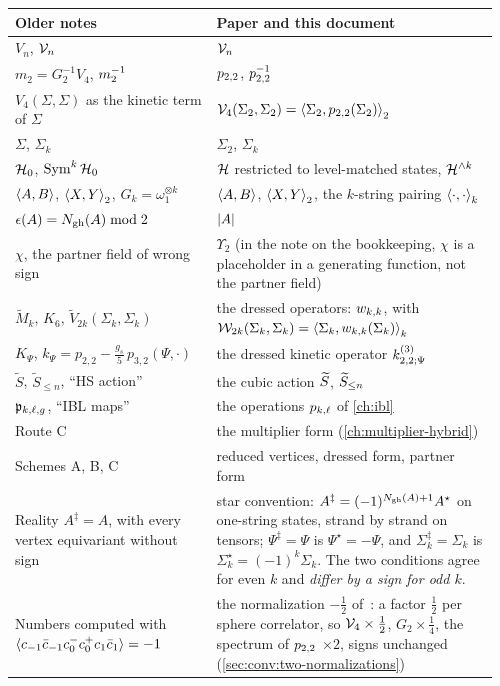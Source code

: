 \begin{center}
  \footnotesize
  \begin{tabular}{@{}>{\raggedright\arraybackslash}p{0.4\linewidth}>{\raggedright\arraybackslash}p{0.56\linewidth}@{}}
    \toprule
    Older notes & Paper and this document \\
    \midrule
    $V_n$, $\mc V_n$ & $\vertex{n}$ \\
    $m_2 = G_2^{-1} V_4$, $\mtwo^{-1}$ & $\sprod{2}{2}$, $\sprod{2}{2}^{-1}$ \\
    $V_4(\Sigma, \Sigma)$ as the kinetic term of $\Sigma$ & $\vertex{4}(\Sigma_2, \Sigma_2) = \pair[2]{\Sigma_2}{\sprod{2}{2}(\Sigma_2)}$ \\
    $\Sigma$, $\Sigma_k$ & $\Sigma_2$, $\Sigma_k$ \\
    $\mc H_0$, $\Sym^k \mc H_0$ & $\Hs$ restricted to level-matched states, $\Hn{k}$ \\
    $\braket{A, B}$, $\braket{X, Y}_2$, $G_k = \omega_1^{\otimes k}$ & $\pair{A}{B}$, $\pair[2]{X}{Y}$, the $k$-string pairing $\pair[k]{\cdot}{\cdot}$ \\
    $\epsilon(A) = \Ngh(A) \bmod 2$ & $\abs{A}$ \\
    $\chi$, the partner field of wrong sign & $\Upsilon_2$ (in the note on the \IBL{} bookkeeping, $\chi$ is a placeholder in a generating function, not the partner field) \\
    $\tilde M_k$, $K_6$, $\tilde V_{2k}(\Sigma_k, \Sigma_k)$ & the dressed operators: $\wprod{k}{k}$, with $\dvertex{2k}(\Sigma_k, \Sigma_k) = \pair[k]{\Sigma_k}{\wprod{k}{k}(\Sigma_k)}$ \\
    $K_\Psi$, $k_\Psi = p_{2,2} - \tfrac{g_s}{5} \, p_{3,2}(\Psi, \cdot)$ & the dressed kinetic operator $\kin{2}{\Psi}{3}$ \\
    $\widetilde S$, $\widetilde S_{\le n}$, \enquote{HS action} & the cubic action $\caction$, $\caction[\le n]$ \\
    $\pklg$, \enquote{IBL maps} & the operations $\sprod{k}{\ell}$ of \cref{ch:ibl} \\
    Route C & the multiplier form (\cref{ch:multiplier-hybrid}) \\
    Schemes A, B, C & reduced vertices, dressed form, partner form \\
    Reality $A^\ddagger = A$, with every vertex equivariant without sign & star convention: $A^\ddagger = (-1)^{\Ngh(A) + 1} A^\star$ on one-string states, strand by strand on tensors; $\Psi^\ddagger = \Psi$ is $\Psi^\star = - \Psi$, and $\Sigma_k^\ddagger = \Sigma_k$ is $\Sigma_k^\star = (-1)^k \Sigma_k$. The two conditions agree for even $k$ and \emph{differ by a sign for odd $k$}. \\
    Numbers computed with $\braket{c_{-1} \bar c_{-1} c_0^- c_0^+ c_1 \bar c_1} = - 1$ & the normalization $- \tfrac{1}{2}$ of~\cite{Erbin:2021:StringFieldTheory}: a factor $\tfrac{1}{2}$ per sphere correlator, so $\vertex{4} \times \tfrac{1}{2}$, $G_2 \times \tfrac{1}{4}$, the spectrum of $\sprod{2}{2}$ $\times 2$, signs unchanged (\cref{sec:conv:two-normalizations}) \\
    \bottomrule
  \end{tabular}
\end{center}

